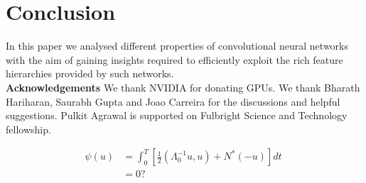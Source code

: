 \documentclass[runningheads]{llncs}
\begin{document}








\section{Conclusion}
\label{sec:conclusion}
In this paper we analysed different properties of convolutional neural networks with the aim of gaining insights required to efficiently exploit the rich feature hierarchies provided by such networks. \\

\noindent \textbf{Acknowledgements}
We thank NVIDIA for donating GPUs. We thank Bharath Hariharan, Saurabh Gupta and Joao Carreira for the discussions and helpful suggestions. Pulkit Agrawal is supported on Fulbright Science and Technology fellowship.  

\begin{align}
  \psi (u) & = \int_{0}^{T} \left[\frac{1}{2}
  \left(\Lambda_{0}^{-1} u,u\right) + N^{\ast} (-u)\right] dt \; \\
& = 0 ?
\end{align}




\end{document}
